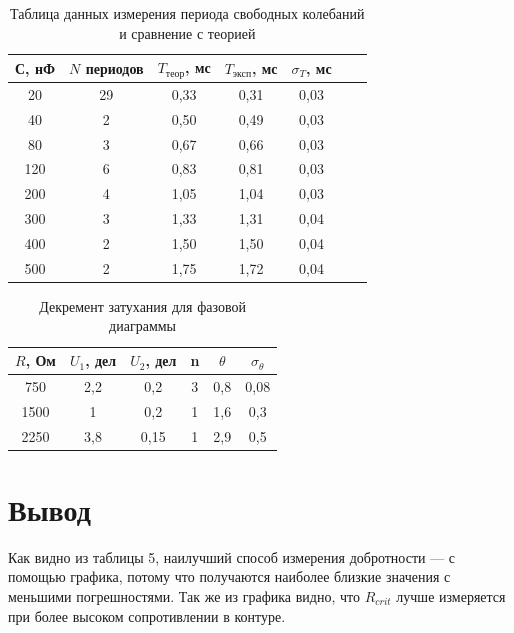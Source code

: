 \documentclass[a4paper, 12pt]{article}%
\begin{document}
\begin{table}[h!]
\begin{center}
\begin{tabular}{|c|c|c|c|c|c|c|}
\hline
С, нФ & $N$ периодов & $T_{\text{теор}}$, мс & $T_{\text{эксп}}$, мс & $\sigma_T$, мс \\ \hline
20               & 29        & 0,33           & 0,31            & 0,03           \\ \hline
40               & 2         & 0,50           & 0,49            & 0,03           \\ \hline
80               & 3         & 0,67           & 0,66            & 0,03           \\ \hline
120              & 6         & 0,83           & 0,81            & 0,03           \\ \hline
200              & 4         & 1,05           & 1,04            & 0,03           \\ \hline
300              & 3         & 1,33           & 1,31            & 0,04           \\ \hline
400              & 2         & 1,50           & 1,50            & 0,04           \\ \hline
500              & 2         & 1,75           & 1,72            & 0,04           \\ \hline
\end{tabular}
\caption{Таблица данных измерения периода свободных колебаний и сравнение с теорией}
\end{center}
\end{table}


\begin{table}[h!]
\begin{center}
\begin{tabular}{|c|c|c|c|c|c|}
\hline
$R$, Ом & $U_1$, дел & $U_2$, дел & n & $\theta$ & $\sigma_{\theta}$ \\ \hline
750  & 2,2  & 0,2        & 3 & 0,8    & 0,08              \\ \hline
1500 & 1    & 0,2        & 1 & 1,6    & 0,3              \\ \hline
2250 & 3,8    & 0,15     & 1 & 2,9    & 0,5              \\ \hline
\end{tabular}
\caption{Декремент затухания для фазовой диаграммы}
\end{center}
\end{table}



\section{Вывод}
Как видно из таблицы 5, наилучший способ измерения добротности --- с помощью графика, потому что получаются наиболее близкие значения с меньшими погрешностями. Так же из графика видно, что $R_{crit}$ лучше измеряется при более высоком сопротивлении в контуре. 
\end{document}
